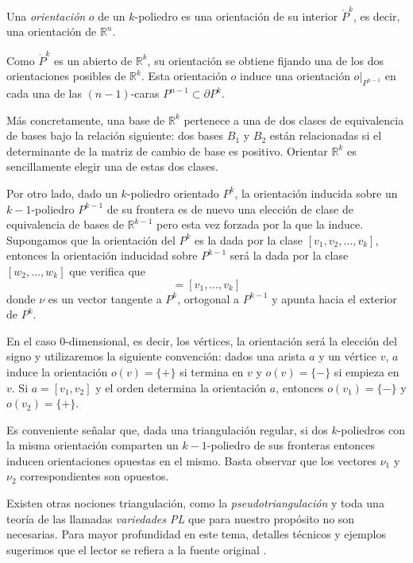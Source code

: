 \begin{definition}
    Una \textit{orientación} $o$ de un $k$-poliedro es una orientación de su interior $\mathring{P}^k$, es decir, una orientación de $\mathbb{R}^n$.
\end{definition}

Como $\mathring{P}^k$ es un abierto de $\mathbb{R}^k$, su orientación se obtiene fijando una de los dos orientaciones posibles de $\mathbb{R}^k$. Esta orientación $o$ induce una orientación $o|_{P^{n-1}}$ en cada una de las $(n-1)$-caras $P^{n-1}\subset \partial P^k$.

Más concretamente, una base de $\mathbb{R}^k$ pertenece a una de dos clases de equivalencia de bases bajo la relación siguiente: dos bases $B_1$ y $B_2$ están relacionadas si el determinante de la matriz de cambio de base es positivo. Orientar $\mathbb{R}^k$ es sencillamente elegir una de estas dos clases.

Por otro lado, dado un $k$-poliedro orientado $P^k$, la orientación inducida sobre un $k-1$-poliedro $P^{k-1}$ de su frontera es de nuevo una elección de clase de equivalencia de bases de $\mathbb{R}^{k-1}$ pero esta vez forzada por la que la induce. Supongamos que la orientación del $P^k$ es la dada por la clase $[v_1,v_2,\dots, v_k]$, entonces la orientación inducidad sobre $P^{k-1}$ será la dada por la clase $[w_2,\dots,w_k]$ que verifica que
\begin{equation*}
    [\nu, w_2,\dots, w_k] = [v_1,\dots,v_k]
\end{equation*}
donde $\nu$ es un vector tangente a $P^k$, ortogonal a $P^{k-1}$ y apunta hacia el exterior de $P^k$.

En el caso $0$-dimensional, es decir, los vértices, la orientación será la elección del signo y utilizaremos la siguiente convención: dados una arista $a$ y un vértice $v$, $a$ induce la orientación $o(v)=\{+\}$ si termina en $v$ y $o(v)=\{-\}$ si empieza en $v$. Si $a=[v_1,v_2]$ y el orden determina la orientación $a$, entonces $o(v_1)=\{-\}$ y $o(v_2)=\{+\}$.

Es conveniente señalar que, dada una triangulación regular, si dos $k$-poliedros con la misma orientación comparten un $k-1$-poliedro de sus fronteras entonces inducen orientaciones opuestas en el mismo. Basta observar que los vectores $\nu_1$ y $\nu_2$ correspondientes son opuestos.

Existen otras nociones triangulación, como la \textit{pseudotriangulación} y toda una teoría de las llamadas \textit{variedades PL} que para nuestro propósito no son necesarias. Para mayor profundidad en este tema, detalles técnicos y ejemplos sugerimos que el lector se refiera a la fuente original \cite{munoz2021}.

